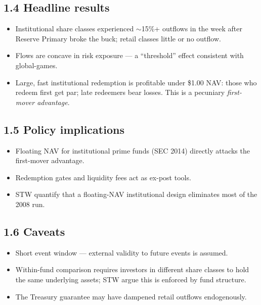 \documentclass[11pt]{article}
\begin{document}
\subsection*{1.4 Headline results}
\begin{itemize}
\item Institutional share classes experienced $\sim$15\%+ outflows in the week after Reserve Primary broke the buck; retail classes little or no outflow.
\item Flows are concave in risk exposure --- a ``threshold'' effect consistent with global-games.
\item Large, fast institutional redemption is profitable under \$1.00 NAV: those who redeem first get par; late redeemers bear losses. This is a pecuniary \emph{first-mover advantage}.
\end{itemize}

\subsection*{1.5 Policy implications}
\begin{itemize}
\item Floating NAV for institutional prime funds (SEC 2014) directly attacks the first-mover advantage.
\item Redemption gates and liquidity fees act as ex-post tools.
\item STW quantify that a floating-NAV institutional design eliminates most of the 2008 run.
\end{itemize}

\subsection*{1.6 Caveats}
\begin{alertbox}
\begin{itemize}
\item Short event window --- external validity to future events is assumed.
\item Within-fund comparison requires investors in different share classes to hold the same underlying assets; STW argue this is enforced by fund structure.
\item The Treasury guarantee may have dampened retail outflows endogenously.
\end{itemize}
\end{alertbox}
\end{document}
